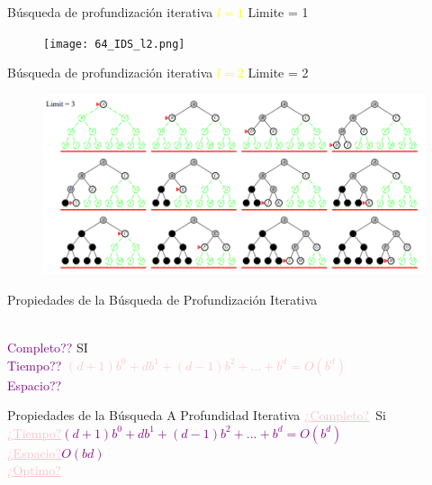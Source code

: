 \documentclass{beamer}
\theoremstyle{definition}
\theoremstyle{theorem}
\theoremstyle{remark}
\begin{document}
\begin{frame}{Búsqueda de profundización iterativa \textcolor{Yellow}{$l=1$}}
    Limite = 1
    \begin{figure}\texttt{[image: 64\_IDS\_l2.png]}\end{figure}
\end{frame}


\begin{frame}{Búsqueda de profundización iterativa \textcolor{Yellow}{$l=2$}}
    Limite = 2
    \begin{figure}\includegraphics[width =123mm]{65_IDS_l2.png}\end{figure}
\end{frame}

\begin{frame}{Propiedades de la Búsqueda de Profundización Iterativa}

        \\\textcolor{purple}{Completo??} SI
        \\\textcolor{purple}{Tiempo??} \textcolor{pink}{$(d+ 1)b^0+db^1+ (d-1)b^2 + ... + b^d= O(b^d)$}
        \\\textcolor{purple}{Espacio??}
    
\end{frame}

\begin{frame}{Propiedades de la Búsqueda A Profundidad Iterativa}
	\small{	
            \textcolor{Pink}{\underline{¿Completo?}}\, Si
            \\
            \textcolor{Pink}{\underline{¿Tiempo?}}\;\textcolor{Purple}{$(d+ 1)b^0+db^1+ (d-1)b^2 + ... + b^d= O(b^d)$}
            \\
            \textcolor{Pink}{\underline{¿Espacio?}}\;\textcolor{Purple}{$O(bd)$}
            \\
            \textcolor{Pink}{\underline{¿Optimo?}}\,
            \\
    }
\end{frame}
\end{document}
